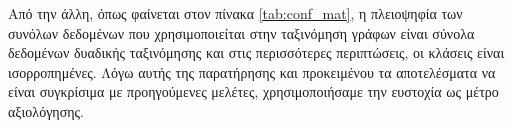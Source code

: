 \begin{table}[]
\centering
{}
\caption{Πίνακας σύγχυσης για ένα πρόβλημα δυαδικής ταξινόμησης.}
\label{tab:conf_mat}
\end{table}
Από την άλλη, όπως φαίνεται στον πίνακα \ref{tab:conf_mat}, η πλειοψηφία των συνόλων δεδομένων που χρησιμοποιείται στην ταξινόμηση γράφων είναι σύνολα δεδομένων δυαδικής ταξινόμησης και στις περισσότερες περιπτώσεις, οι κλάσεις είναι ισορροπημένες.
Λόγω αυτής της παρατήρησης και προκειμένου τα αποτελέσματα να είναι συγκρίσιμα με προηγούμενες μελέτες, χρησιμοποιήσαμε την ευστοχία ως μέτρο αξιολόγησης.

